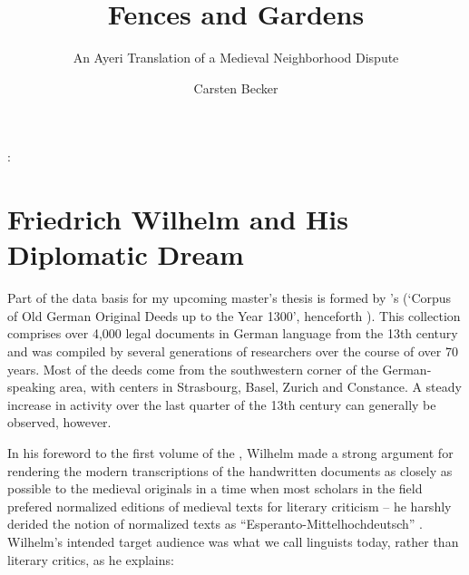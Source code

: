 \documentclass[12pt,paper=a4]{scrartcl}
\author{Carsten Becker}
\title{Fences and Gardens}
\subtitle{An Ayeri Translation of a Medieval Neighborhood Dispute}
\newenvironment{mytitle}{
    \hfill
    \begin{minipage}{0.667\textwidth}
	\vspace{\baselineskip}
	\begin{center}
	    \Large
	    \sffamily\bfseries
	    \makeatletter
}{
	    \makeatother
	\end{center}
	\vspace{1em}
    \end{minipage}
    \hfill
}
\begin{document}

\begin{mytitle}
    \@title: \@subtitle
\end{mytitle}

\section{Friedrich Wilhelm and His Diplomatic Dream}
Part of the data basis for my upcoming master's thesis is formed 
by \citeauthor{CAO}'s  (\enquote*{Corpus of Old German Original 
Deeds up to the Year 1300}, henceforth ). This collection 
comprises over 4,000 legal documents in German language from the 13th century 
and was compiled by several generations of researchers over the course of over 
70 years. Most of the deeds come from the southwestern corner of the 
German-speaking area, with centers in Strasbourg, Basel, Zurich and Constance. A 
steady increase in activity over the last quarter of the 13th century can 
generally be observed, however.

In his foreword to the first volume of the , Wilhelm made a 
strong argument for rendering the modern transcriptions of the handwritten 
documents as closely as possible to the medieval originals in a time when most 
scholars in the field prefered normalized editions of medieval texts for 
literary criticism – he harshly derided the notion of normalized texts as 
\enquote{Esperanto-Mittelhochdeutsch} \autocite[see][VIII--IX]{CAO1}. Wilhelm's 
intended target audience was what we call linguists today, rather than literary 
critics, as he explains:
\end{document}
